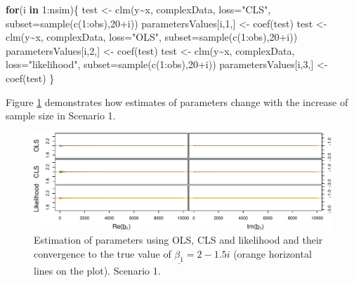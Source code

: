 \documentclass[
]{book}
\newenvironment{Shaded}{\begin{snugshade}}{\end{snugshade}}
\newcommand{\AttributeTok}[1]{\textcolor[rgb]{0.77,0.63,0.00}{#1}}
\newcommand{\ControlFlowTok}[1]{\textcolor[rgb]{0.13,0.29,0.53}{\textbf{#1}}}
\newcommand{\DecValTok}[1]{\textcolor[rgb]{0.00,0.00,0.81}{#1}}
\newcommand{\FunctionTok}[1]{\textcolor[rgb]{0.00,0.00,0.00}{#1}}
\newcommand{\NormalTok}[1]{#1}
\newcommand{\OtherTok}[1]{\textcolor[rgb]{0.56,0.35,0.01}{#1}}
\newcommand{\SpecialCharTok}[1]{\textcolor[rgb]{0.00,0.00,0.00}{#1}}
\newcommand{\StringTok}[1]{\textcolor[rgb]{0.31,0.60,0.02}{#1}}
\begin{document}
\begin{Shaded}
\begin{Highlighting}[]
\ControlFlowTok{for}\NormalTok{(i }\ControlFlowTok{in} \DecValTok{1}\SpecialCharTok{:}\NormalTok{nsim)\{}
\NormalTok{    test }\OtherTok{\textless{}{-}} \FunctionTok{clm}\NormalTok{(y}\SpecialCharTok{\textasciitilde{}}\NormalTok{x, complexData, }\AttributeTok{loss=}\StringTok{"CLS"}\NormalTok{,}
                \AttributeTok{subset=}\FunctionTok{sample}\NormalTok{(}\FunctionTok{c}\NormalTok{(}\DecValTok{1}\SpecialCharTok{:}\NormalTok{obs),}\DecValTok{20}\SpecialCharTok{+}\NormalTok{i))}
\NormalTok{    parametersValues[i,}\DecValTok{1}\NormalTok{,] }\OtherTok{\textless{}{-}} \FunctionTok{coef}\NormalTok{(test)}
\NormalTok{    test }\OtherTok{\textless{}{-}} \FunctionTok{clm}\NormalTok{(y}\SpecialCharTok{\textasciitilde{}}\NormalTok{x, complexData, }\AttributeTok{loss=}\StringTok{"OLS"}\NormalTok{,}
                \AttributeTok{subset=}\FunctionTok{sample}\NormalTok{(}\FunctionTok{c}\NormalTok{(}\DecValTok{1}\SpecialCharTok{:}\NormalTok{obs),}\DecValTok{20}\SpecialCharTok{+}\NormalTok{i))}
\NormalTok{    parametersValues[i,}\DecValTok{2}\NormalTok{,] }\OtherTok{\textless{}{-}} \FunctionTok{coef}\NormalTok{(test)}
\NormalTok{    test }\OtherTok{\textless{}{-}} \FunctionTok{clm}\NormalTok{(y}\SpecialCharTok{\textasciitilde{}}\NormalTok{x, complexData, }\AttributeTok{loss=}\StringTok{"likelihood"}\NormalTok{,}
                \AttributeTok{subset=}\FunctionTok{sample}\NormalTok{(}\FunctionTok{c}\NormalTok{(}\DecValTok{1}\SpecialCharTok{:}\NormalTok{obs),}\DecValTok{20}\SpecialCharTok{+}\NormalTok{i))}
\NormalTok{    parametersValues[i,}\DecValTok{3}\NormalTok{,] }\OtherTok{\textless{}{-}} \FunctionTok{coef}\NormalTok{(test)}
\NormalTok{\}}
\end{Highlighting}
\end{Shaded}

Figure \ref{fig:parametersUCDV} demonstrates how estimates of parameters change with the increase of sample size in Scenario 1.

\begin{figure}
\centering
\includegraphics{Svetunkov---Svetunkov---Complex-Valued-Econometrics_files/figure-latex/parametersUCDV-1.pdf}
\caption{\label{fig:parametersUCDV}Estimation of parameters using OLS, CLS and likelihood and their convergence to the true value of \(\underline{\beta_1}=2-1.5i\) (orange horizontal lines on the plot). Scenario 1.}
\end{figure}
\end{document}
